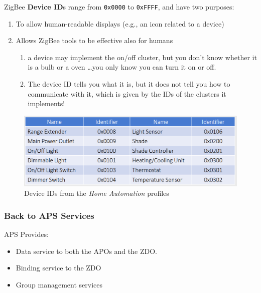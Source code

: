 \begin{paracol}{2}
   ZigBee \textbf{Device ID}s range from \texttt{0x0000} to \texttt{0xFFFF}, and have two purposes:
   \begin{enumerate}
      \item To allow human-readable displays (e.g., an icon related to a device)
      \item Allows ZigBee tools to be effective also for humans
      \begin{enumerate}
         \item a device may implement the on/off cluster, but you don’t know whether it is a bulb or a oven \dots you only know you can turn it on or off.
         \item The device ID tells you what it is, but it does not tell you how to communicate with it, which is given by the IDs of the clusters it implements!
      \end{enumerate}
   \end{enumerate}

   \switchcolumn

   \begin{figure}[htbp]
      \centering
      \includegraphics{images/zigbee_deviceIDs.png}
      \caption{Device IDs from the \textit{Home Automation} profiles}
      \label{fig:zigbee_deviceIDs}
   \end{figure}
\end{paracol}

\subsubsection{Back to APS Services}
APS Provides:
\begin{itemize}
   \item Data service to both the APOs and the ZDO.
   \item Binding service to the ZDO
   \item Group management services
\end{itemize}

